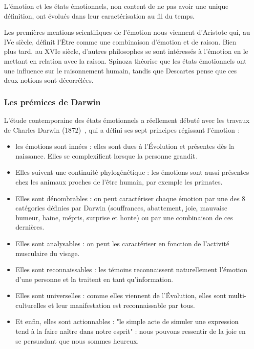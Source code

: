 L'émotion et les états émotionnels, non content de ne pas avoir une unique définition, ont évolués dans leur caractérisation au fil du temps.

Les premières mentions scientifiques de l'émotion nous viennent d'Aristote qui, au IVe siècle, définit l'Être comme une combinaison d'émotion et de raison. Bien plus tard, au XVIe siècle, d'autres philosophes se sont intéressés à l'émotion en le mettant en relation avec la raison. Spinoza théorise que les états émotionnels ont une influence sur le raisonnement humain, tandis que Descartes pense que ces deux notions sont décorrélées.

\subsubsection{Les prémices de Darwin}
L'étude contemporaine des états émotionnels a réellement débuté avec les travaux de Charles Darwin (1872)~\cite{Darwin1872}, qui a défini ses sept principes régissant l'émotion :
\begin{itemize}
    \item les émotions sont innées : elles sont dues à l'Évolution et présentes dès la naissance. Elles se complexifient lorsque la personne grandit.
    \item Elles suivent une continuité phylogénétique : les émotions sont aussi présentes chez les animaux proches de l'être humain, par exemple les primates.
    \item Elles sont dénombrables : on peut caractériser chaque émotion par une des 8 catégories définies par Darwin (souffrances, abattement, joie, mauvaise humeur, haine, mépris, surprise et honte) ou par une combinaison de ces dernières.
    \item Elles sont analysables : on peut les caractériser en fonction de l'activité musculaire du visage.
    \item Elles sont reconnaissables : les témoins reconnaissent naturellement l'émotion d'une personne et la traitent en tant qu'information.
    \item Elles sont universelles : comme elles viennent de l'Évolution, elles sont multi-culturelles et leur manifestation est reconnaissable par tous.
    \item Et enfin, elles sont actionnables : "le simple acte de simuler une expression tend à la faire naître dans notre esprit" : nous pouvons ressentir de la joie en se persuadant que nous sommes heureux.
\end{itemize}

